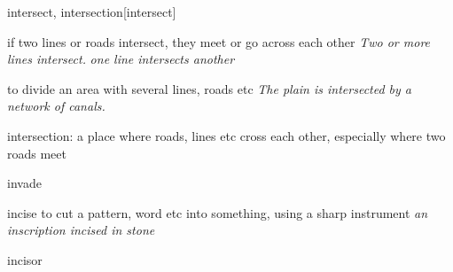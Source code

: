 \begin{word}{intersect, intersection}[intersect]
    
    if two lines or roads intersect, they meet or go across each other
    \textit{Two or more lines intersect.}
    \textit{one line intersects another}

    to divide an area with several lines, roads etc
    \textit{The plain is intersected by a network of canals.}

    intersection: a place where roads, lines etc cross each other, especially where two roads meet
\end{word}

\begin{word}{invade}
\end{word}


\begin{word}{incise}
    to cut a pattern, word etc into something, using a sharp instrument
    \textit{an inscription incised in stone}
\end{word}

\begin{word}{incisor}
\end{word}
